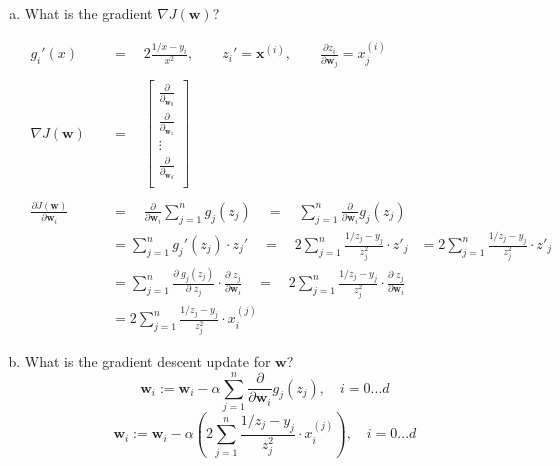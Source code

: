 \documentclass[11pt]{article}
\newcommand{\wbf}{\mathbf{w}}
\newcommand{\xbf}{\mathbf{x}}
\begin{document}
\begin{enumerate}
\begin{enumerate}[(a)]
\item What is the gradient $\nabla J(\wbf)$?

\begin{align*}
	g_i'(x) \quad &= \quad 2 \frac{ 1/x - y_i}{x^2}, \qquad
	z_i' = \xbf^{(i)},\qquad  \frac{\partial z_i}{\partial {\wbf_j}} = x^{(i)}_j \\
    		\\ %
	\nabla J(\wbf) \quad &= \quad \begin{bmatrix}
						\frac{\partial}{\partial_{\wbf_0}} \\
                        \frac{\partial}{\partial_{\wbf_1}} \\
                        	\vdots 						   \\
                        \frac{\partial}{\partial_{\wbf_d}} \\
					  \end{bmatrix} \\
            \\ %
    \frac{\partial J(\wbf)}{\partial \wbf_i} \quad &= \quad \frac{\partial}{\partial \wbf_i} \sum_{j=1}^n g_j(z_j) \quad = \quad \sum_{j=1}^n \frac{\partial}{\partial \wbf_i} g_j(z_j) \\
    &= \sum_{j=1}^n g_j'(z_j) \cdot z_j' \quad 
    		= \quad 2 \sum_{j=1}^n \frac{1/z_j - y_j}{z_j^2} \cdot z'_j
    &= 2 \sum_{j=1}^n \frac{1/z_j - y_j}{z_j^2} \cdot z'_j \\
    &= \sum_{j=1}^n \frac{\partial \; g_j(z_j)}{\partial \; z_j} \cdot 
    	\frac{\partial \; z_j}{\partial \wbf_i} \quad
        = \quad 2 \sum_{j=1}^n \frac{1/z_j - y_j}{z_j^2} \cdot 
        	\frac{\partial \; z_j}{\partial \wbf_i} \\
    &= 2 \sum_{j=1}^n \frac{1/z_j - y_j}{z_j^2} \cdot x^{(j)}_i
\end{align*}

\newpage
\item What is the gradient descent update for $\wbf$?
\[
	\wbf_i := \wbf_i - \alpha \sum_{j=1}^n \frac{\partial}{\partial \wbf_i} g_j(z_j) ,\quad i=0...d
\]
\[
	\wbf_i := \wbf_i - \alpha \left( 2 \sum_{j=1}^n \frac{1/z_j - y_j}{z_j^2} \cdot x^{(j)}_i \right) , \quad i=0...d
\]


\end{enumerate}
\end{enumerate}
\end{document}
